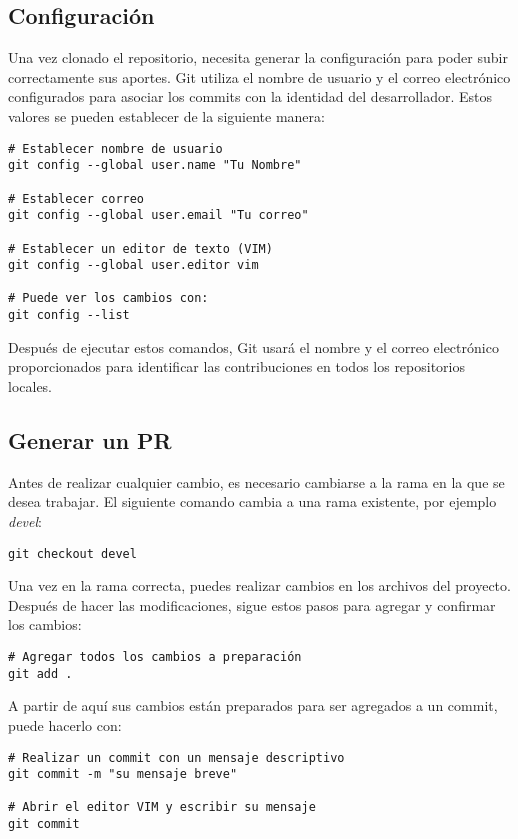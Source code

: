 \documentclass[a4paper]{article}
\begin{document}
\subsection{Configuración}
\indent Una vez clonado el repositorio, necesita generar la configuración para poder subir correctamente sus aportes. 
Git utiliza el nombre de usuario y el correo electrónico configurados para asociar los commits con la identidad del desarrollador. Estos valores se pueden establecer de la siguiente manera:

\begin{verbatim}
# Establecer nombre de usuario
git config --global user.name "Tu Nombre"

# Establecer correo
git config --global user.email "Tu correo"

# Establecer un editor de texto (VIM)
git config --global user.editor vim

# Puede ver los cambios con:
git config --list

\end{verbatim}

Después de ejecutar estos comandos, Git usará el nombre y el correo electrónico proporcionados para identificar las contribuciones en todos los repositorios locales.

\subsection{Generar un PR}

Antes de realizar cualquier cambio, es necesario cambiarse a la rama en la que se desea trabajar. El siguiente comando cambia a una rama existente, por ejemplo \textit{devel}:

\begin{verbatim}
git checkout devel
\end{verbatim}

Una vez en la rama correcta, puedes realizar cambios en los archivos del proyecto. Después de hacer las modificaciones, sigue estos pasos para agregar y confirmar los cambios:
\begin{verbatim}
# Agregar todos los cambios a preparación
git add .
\end{verbatim}

A partir de aquí sus cambios están preparados para ser agregados a un commit, puede hacerlo con:

\begin{verbatim}
# Realizar un commit con un mensaje descriptivo
git commit -m "su mensaje breve"

# Abrir el editor VIM y escribir su mensaje
git commit
\end{verbatim}
\end{document}
